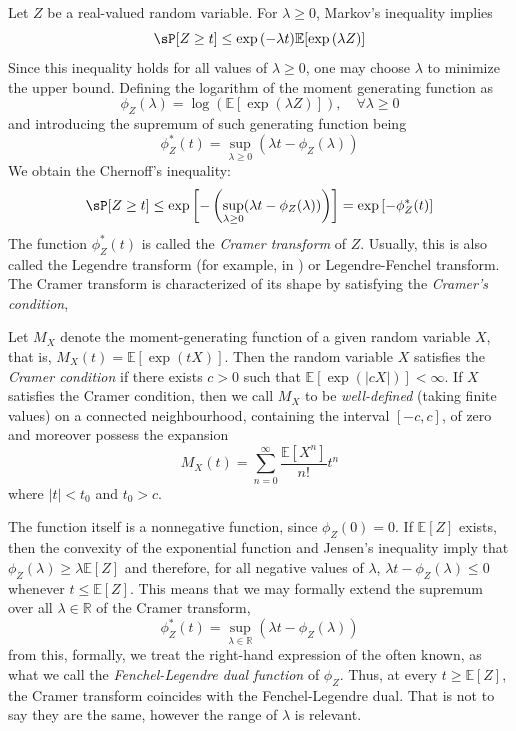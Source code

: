 Let $Z$ be a real-valued random variable. For $\lambda\geq 0$, Markov's inequality implies 
\begin{equation}
    \sP [Z\geq t] \leq \exp{(-\lambda t)}\mathbb{E}[\exp{(\lambda Z)}]
\end{equation}
Since this inequality holds for all values of $\lambda \geq 0$, one may choose $\lambda$ to minimize the upper bound. Defining the logarithm of the moment generating function as 
\begin{equation}
    \phi_{Z}(\lambda) = \log{(\mathbb{E}[\exp{(\lambda Z)}])}, \quad \forall \lambda \geq 0 
\end{equation}
and introducing the supremum of such generating function being \begin{equation}
    \phi_{Z}^{*}(t) = \sup_{\lambda\geq 0}(\lambda t - \phi_{Z}(\lambda))
\end{equation}
We obtain the Chernoff's inequality: 
\begin{equation}
    \sP [Z\geq t] \leq \exp{\left[-\left(\sup_{\lambda\geq 0}(\lambda t - \phi_{Z}(\lambda))\right)\right]} = \exp{[-\phi_{Z}^{*}(t)]}
\end{equation}
The function $\phi_{Z}^{*}(t)$ is called the \textit{Cramer transform} of $Z$. Usually, this is also called the Legendre transform (for example, in \cite{OstaszewskaZajkowski2014}) or Legendre-Fenchel transform. The Cramer transform is characterized of its shape by satisfying the \textit{Cramer's condition}, 
\begin{definition}
    Let $M_{X}$ denote the moment-generating function of a given random variable $X$, that is, $M_{X}(t)=\mathbb{E}[\exp{(tX)}]$. Then the random variable $X$ satisfies the \textit{Cramer condition} if there exists $c>0$ such that $\mathbb{E}[\exp{(|cX|)}]< \infty$. If $X$ satisfies the Cramer condition, then we call $M_{X}$ to be \textit{well-defined} (taking finite values) on a connected neighbourhood, containing the interval $[-c,c]$, of zero and moreover possess the expansion
    \begin{equation}
        M_{X}(t) = \sum^{\infty}_{n=0}\frac{\mathbb{E}[X^{n}]}{n!}t^{n}
    \end{equation}
    where $|t|<t_{0}$ and $t_{0}>c$. 
\end{definition}
The function itself is a nonnegative function, since $\phi_{Z}(0)=0$. If $\mathbb{E}[Z]$ exists, then the convexity of the exponential function and Jensen's inequality imply that $\phi_{Z}(\lambda)\geq \lambda \mathbb{E}[Z]$ and therefore, for all negative values of $\lambda$, $\lambda t - \phi_{Z}(\lambda)\leq 0$ whenever $t\leq \mathbb{E}[Z]$. This means that we may formally extend the supremum over all $\lambda \in \mathbb{R}$ of the Cramer transform, 
\begin{equation}
    \phi_{Z}^{*}(t) = \sup_{\lambda\in \mathbb{R}}(\lambda t - \phi_{Z}(\lambda))
\end{equation}
from this, formally, we treat the right-hand expression of the often known, as what we call the \textit{Fenchel-Legendre dual function} of $\phi_{Z}$. Thus, at every $t\geq \mathbb{E}[Z]$, the Cramer transform coincides with the Fenchel-Legendre dual. That is not to say they are the same, however the range of $\lambda$ is relevant. 